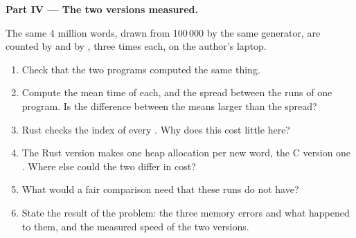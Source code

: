 \begin{problem}
\medskip\noindent\textbf{Part IV --- The two versions measured.}\par\nopagebreak
The same 4 million words, drawn from 100\,000 by the same generator, are counted by  and by
, three times each, on the author's laptop.
\begin{enumerate}[resume, beginpenalty=10000]
\item Check that the two programs computed the same thing.
\item Compute the mean time of each, and the spread between the runs of one program. Is the difference between the
means larger than the spread?
\item Rust checks the index of every . Why does this cost little here?
\item The Rust version makes one heap allocation per new word, the C version one . Where else could the
two differ in cost?
\item What would a fair comparison need that these runs do not have?
\item State the result of the problem: the three memory errors and what happened to them, and the measured speed of
the two versions.
\end{enumerate}
\end{problem}
